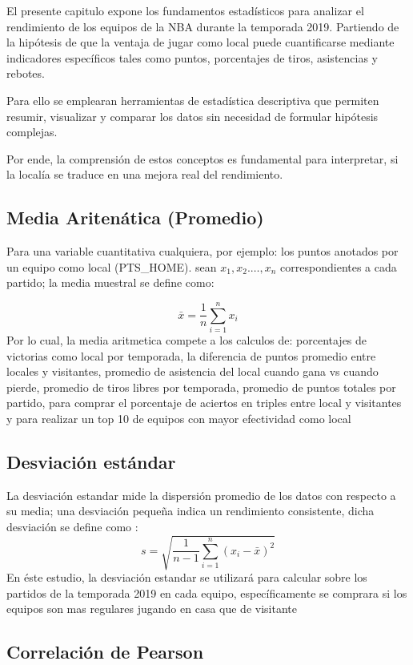 \documentclass[oneside,11pt]{Latex/Classes/PhDthesisPSnPDF}
\begin{document}
El presente capitulo expone los fundamentos estadísticos para analizar
el rendimiento de los equipos de la NBA durante la temporada 2019.
Partiendo de la hipótesis de que la ventaja de jugar como local puede
cuantificarse mediante indicadores específicos tales como puntos,
porcentajes de tiros, asistencias y rebotes.

Para ello se emplearan herramientas de estadística descriptiva que
permiten resumir, visualizar y comparar los datos sin necesidad de
formular hipótesis complejas.

Por ende, la comprensión de estos conceptos es fundamental para
interpretar, si la localía se traduce en una mejora real del
rendimiento.

\subsection{Media Aritenática (Promedio)}

Para una variable cuantitativa cualquiera, por ejemplo: los puntos
anotados por un equipo como local (PTS\_HOME). sean
\(x_1, x_2. \ldots, x_n\) correspondientes a cada partido; la media
muestral se define como:

\[\bar{x} = \frac{1}{n} \sum_{i=1}^{n} x_i\] Por lo cual, la media
aritmetica compete a los calculos de: porcentajes de victorias como
local por temporada, la diferencia de puntos promedio entre locales y
visitantes, promedio de asistencia del local cuando gana vs cuando
pierde, promedio de tiros libres por temporada, promedio de puntos
totales por partido, para comprar el porcentaje de aciertos en triples
entre local y visitantes y para realizar un top 10 de equipos con mayor
efectividad como local

\subsection{Desviación estándar}

La desviación estandar mide la dispersión promedio de los datos con
respecto a su media; una desviación pequeña indica un rendimiento
consistente, dicha desviación se define como :
\[ s = \sqrt {\frac{1}{n-1} \sum_{i=1}^{n} (x_i - \bar{x})^2} \] En éste
estudio, la desviación estandar se utilizará para calcular sobre los
partidos de la temporada 2019 en cada equipo, específicamente se
comprara si los equipos son mas regulares jugando en casa que de
visitante

\subsection{Correlación de Pearson}
\end{document}
